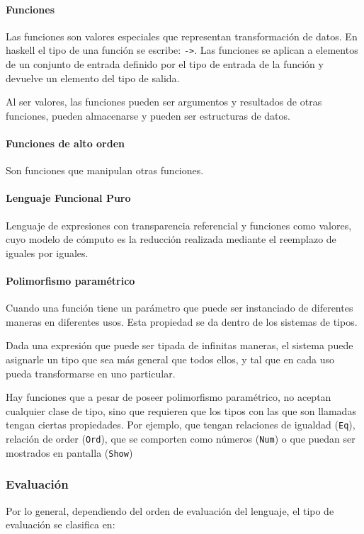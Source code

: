 \paragraph{Funciones} Las funciones son valores especiales que representan transformación de datos. En haskell el tipo de una función se escribe: \texttt{->}. Las funciones se aplican a elementos de un conjunto de entrada definido por el tipo de entrada de la función y devuelve un elemento del tipo de salida.

Al ser valores, las funciones pueden ser argumentos y resultados de otras funciones, pueden almacenarse y pueden ser estructuras de datos.

\paragraph{Funciones de alto orden} Son funciones que manipulan otras funciones.

\paragraph{Lenguaje Funcional Puro} Lenguaje de expresiones con transparencia referencial y funciones como valores, cuyo modelo de cómputo es la reducción realizada mediante el reemplazo de iguales por iguales.

\paragraph{Polimorfismo paramétrico} Cuando una función tiene un parámetro que puede ser instanciado de diferentes maneras en diferentes usos. Esta propiedad se da dentro de los sistemas de tipos.

Dada una expresión que puede ser tipada de infinitas maneras, el sistema puede asignarle un tipo que sea más general que todos ellos, y tal que en cada uso pueda transformarse en uno particular.

Hay funciones que a pesar de poseer polimorfismo paramétrico, no aceptan cualquier clase de tipo, sino que requieren que los tipos con las que son llamadas tengan ciertas propiedades. Por ejemplo, que tengan relaciones de igualdad (\texttt{Eq}), relación de order (\texttt{Ord}), que se comporten como números (\texttt{Num}) o que puedan ser mostrados en pantalla (\texttt{Show})

\subsubsection{Evaluación}
Por lo general, dependiendo del orden de evaluación del lenguaje, el tipo de evaluación se  clasifica en:

